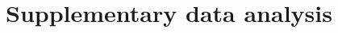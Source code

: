 \documentclass[9pt,a4paper,twocolumn,lineno]{article}
\begin{document}
\section*{Supplementary data analysis}
%
\end{document}
